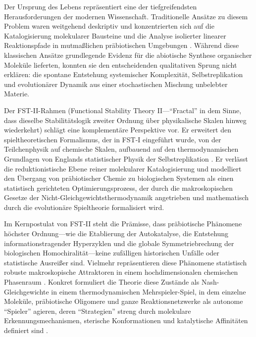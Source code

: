 \documentclass[12pt,a4paper]{article}
\theoremstyle{remark}
\begin{document}
Der Ursprung des Lebens repr\"asentiert eine der tiefgreifendsten Herausforderungen der modernen Wissenschaft. Traditionelle Ans\"atze zu diesem Problem waren weitgehend deskriptiv und konzentrierten sich auf die Katalogisierung molekularer Bausteine und die Analyse isolierter linearer Reaktionspfade in mutma\ss{}lichen pr\"abiotischen Umgebungen \citep{MillerUrey}. W\"ahrend diese klassischen Ans\"atze grundlegende Evidenz f\"ur die abiotische Synthese organischer Molek\"ule lieferten, konnten sie den entscheidenden qualitativen Sprung nicht erkl\"aren: die spontane Entstehung systemischer Komplexit\"at, Selbstreplikation und evolution\"arer Dynamik aus einer stochastischen Mischung unbelebter Materie.

Der FST-II-Rahmen (Functional Stability Theory II---``Fractal'' in dem Sinne, dass dieselbe Stabilit\"atslogik zweiter Ordnung \"uber physikalische Skalen hinweg wiederkehrt) schl\"agt eine komplement\"are Perspektive vor. Er erweitert den spieltheoretischen Formalismus, der in FST-I \citep{FSTI} eingef\"uhrt wurde, von der Teilchenphysik auf chemische Skalen, aufbauend auf den thermodynamischen Grundlagen von Englands statistischer Physik der Selbstreplikation \citep{England2013}. Er verl\"asst die reduktionistische Ebene reiner molekularer Katalogisierung und modelliert den \"Ubergang von pr\"abiotischer Chemie zu biologischen Systemen als einen statistisch gerichteten Optimierungsprozess, der durch die makroskopischen Gesetze der Nicht-Gleichgewichtsthermodynamik angetrieben und mathematisch durch die evolution\"are Spieltheorie formalisiert wird.

Im Kernpostulat von FST-II steht die Pr\"amisse, dass pr\"abiotische Ph\"anomene h\"ochster Ordnung---wie die Etablierung der Autokatalyse, die Entstehung informationstragender Hyperzyklen \citep{Eigen1979} und die globale Symmetriebrechung der biologischen Homochiralit\"at---keine zuf\"alligen historischen Unf\"alle oder statistische Ausrei\ss{}er sind. Vielmehr repr\"asentieren diese Ph\"anomene statistisch robuste makroskopische Attraktoren in einem hochdimensionalen chemischen Phasenraum \citep{ReplicatorEntropy}. Konkret formuliert die Theorie diese Zust\"ande als Nash-Gleichgewichte in einem thermodynamischen Mehrspieler-Spiel, in dem einzelne Molek\"ule, pr\"abiotische Oligomere und ganze Reaktionsnetzwerke als autonome ``Spieler'' agieren, deren ``Strategien'' streng durch molekulare Erkennungsmechanismen, sterische Konformationen und katalytische Affinit\"aten definiert sind \citep{CGT2018,CGTMacmillan}.
\end{document}
